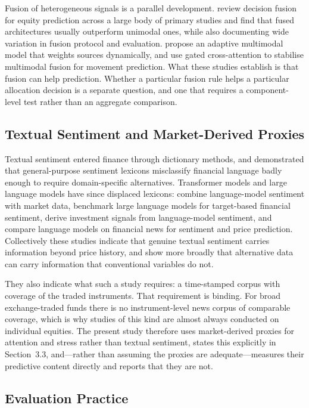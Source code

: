 \documentclass{singlecol-new}
\theoremstyle{TH}{
\newtheorem{lemma}{Lemma}
\newtheorem{theorem}[lemma]{Theorem}
\newtheorem{corrolary}[lemma]{Corrolary}
\newtheorem{conjecture}[lemma]{Conjecture}
\newtheorem{proposition}[lemma]{Proposition}
\newtheorem{claim}[lemma]{Claim}
\newtheorem{stheorem}[lemma]{Wrong Theorem}
\newtheorem{algorithm}{Algorithm}
}
\theoremstyle{THrm}{
\newtheorem{definition}{Definition}[section]
\newtheorem{question}{Question}[section]
\newtheorem{remark}{Remark}
\newtheorem{scheme}{Scheme}
}
\theoremstyle{THhit}{
\newtheorem{case}{Case}[section]
}
\begin{document}
Fusion of heterogeneous signals is a parallel development. \citet{zhang22} review
decision fusion for equity prediction across a large body of primary studies and find
that fused architectures usually outperform unimodal ones, while also documenting wide
variation in fusion protocol and evaluation. \citet{farimani24} propose an adaptive
multimodal model that weights sources dynamically, and \citet{zong25} use gated
cross-attention to stabilise multimodal fusion for movement prediction. What these
studies establish is that fusion can help prediction. Whether a particular fusion rule
helps a particular allocation decision is a separate question, and one that requires a
component-level test rather than an aggregate comparison.

\subsection{Textual Sentiment and Market-Derived Proxies}

Textual sentiment entered finance through dictionary methods, and
\citet{loughran11} demonstrated that general-purpose sentiment lexicons misclassify
financial language badly enough to require domain-specific alternatives. Transformer
models and large language models have since displaced lexicons: \citet{officioso26}
combine language-model sentiment with market data, \citet{muhammad26} benchmark large
language models for target-based financial sentiment, \citet{mun25} derive investment
signals from language-model sentiment, and \citet{chuang25} compare language models on
financial news for sentiment and price prediction. Collectively these studies indicate
that genuine textual sentiment carries information beyond price history, and
\citet{mazzotta25} show more broadly that alternative data can carry information that
conventional variables do not.

They also indicate what such a study requires: a time-stamped corpus with coverage of
the traded instruments. That requirement is binding. For broad exchange-traded funds
there is no instrument-level news corpus of comparable coverage, which is why studies
of this kind are almost always conducted on individual equities. The present study
therefore uses market-derived proxies for attention and stress rather than textual
sentiment, states this explicitly in Section~3.3, and---rather than assuming the proxies
are adequate---measures their predictive content directly and reports that they are
not.

\subsection{Evaluation Practice}
\end{document}
